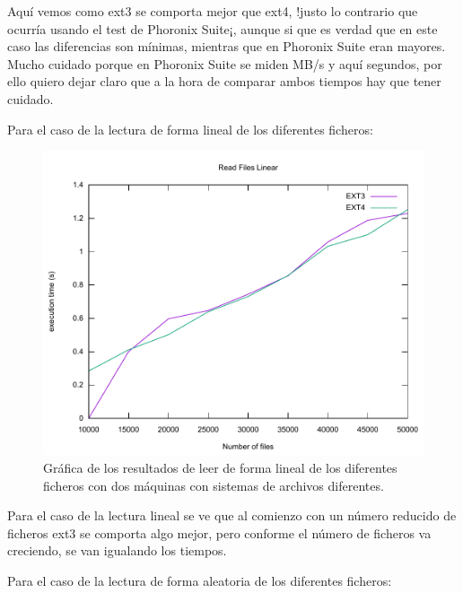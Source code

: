 Aquí vemos como ext3 se comporta mejor que ext4, !justo lo contrario que ocurría usando el test de Phoronix Suite¡, aunque si que es verdad que en este caso las diferencias son mínimas, mientras que en Phoronix Suite eran mayores. Mucho cuidado porque en Phoronix Suite se miden MB/s y aquí segundos, por ello quiero dejar claro que a la hora de comparar ambos tiempos hay que tener cuidado.

\newpage
Para el caso de la lectura de forma lineal de los diferentes ficheros:

\begin{figure}[H]
	\begin{center}
		\includegraphics[width=15cm]{Imagenes/Read_Files_Linear}
		\caption{Gráfica de los resultados de leer de forma lineal de los diferentes ficheros con dos máquinas con sistemas de archivos diferentes.}
		\label{fig:31}
	\end{center}
\end{figure}

Para el caso de la lectura lineal se ve que al comienzo con un número reducido de ficheros ext3 se comporta algo mejor, pero conforme el número de ficheros va creciendo, se van igualando los tiempos.

\newpage
Para el caso de la lectura de forma aleatoria de los diferentes ficheros:

